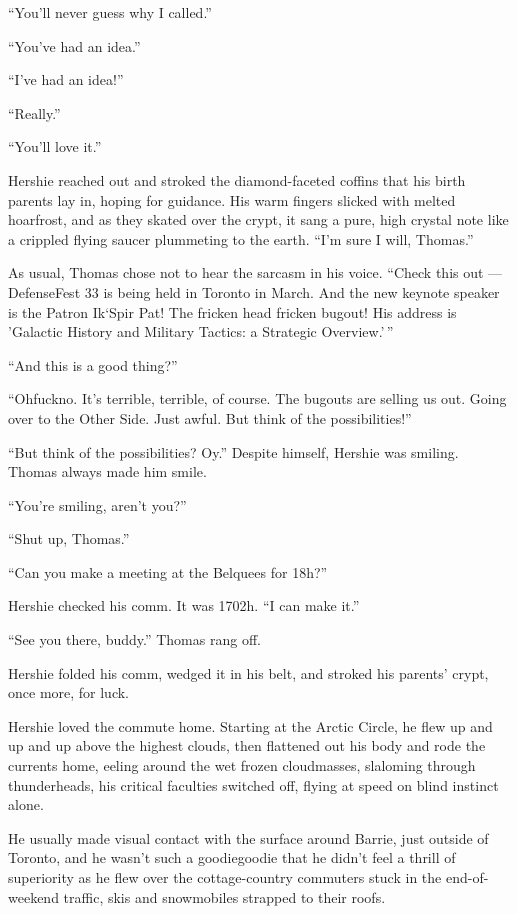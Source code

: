 ``You'll never guess why I called.''

``You've had an idea.''

``I've had an idea!''

``Really.''

``You'll love it.''

Hershie reached out and stroked the diamond-faceted coffins that
his birth parents lay in, hoping for guidance. His warm fingers
slicked with melted hoarfrost, and as they skated over the crypt,
it sang a pure, high crystal note like a crippled flying saucer
plummeting to the earth. ``I'm sure I will, Thomas.''

As usual, Thomas chose not to hear the sarcasm in his voice.
``Check this out --- DefenseFest 33 is being held in Toronto in March. And the 
new keynote speaker is the Patron Ik`Spir Pat! The fricken head fricken bugout! 
His address is 'Galactic History and Military Tactics: a Strategic 
Overview.'\,''

``And this is a good thing?''

``Ohfuckno. It's terrible, terrible, of course. The bugouts are selling us out. 
Going over to the Other Side. Just awful. But think of the possibilities!''

``But think of the possibilities? Oy.'' Despite himself, Hershie
was smiling. Thomas always made him smile.

``You're smiling, aren't you?''

``Shut up, Thomas.''

``Can you make a meeting at the Belquees for 18h?''

Hershie checked his comm. It was 1702h. ``I can make it.''

``See you there, buddy.'' Thomas rang off.

Hershie folded his comm, wedged it in his belt, and stroked his
parents' crypt, once more, for luck.

\tb

Hershie loved the commute home. Starting at the Arctic Circle, he
flew up and up and up above the highest clouds, then flattened out
his body and rode the currents home, eeling around the wet frozen
cloudmasses, slaloming through thunderheads, his critical faculties
switched off, flying at speed on blind instinct alone.

He usually made visual contact with the surface around Barrie, just
outside of Toronto, and he wasn't such a goodiegoodie that he
didn't feel a thrill of superiority as he flew over the
cottage-country commuters stuck in the end-of-weekend traffic, skis
and snowmobiles strapped to their roofs.

